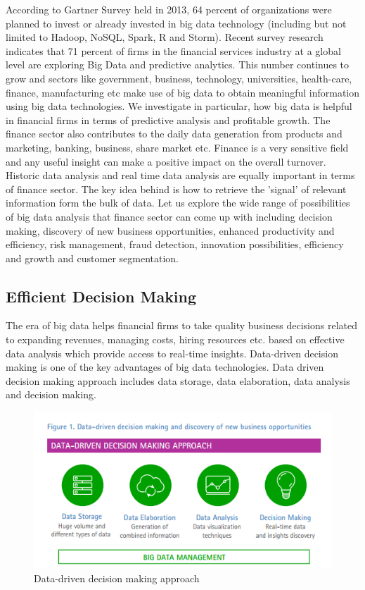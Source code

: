 \documentclass[sigconf]{acmart}
\begin{document}
According to Gartner Survey held in 2013, 64 percent of organizations were planned to invest or already invested in big data technology (including but not limited to Hadoop, NoSQL, Spark, R and Storm)\cite{gartner-survey}. Recent survey research indicates that 71 percent of firms in the financial services
industry at a global level are exploring Big
Data and predictive analytics\cite{accenture-next-generation-financial}. This number continues to grow and sectors like government, business, technology, universities, health-care, finance, manufacturing etc make use of big data to obtain meaningful information using big data technologies\cite{wiki-bigdata}. We investigate in particular, how big data is helpful in financial firms in terms of predictive analysis and profitable growth. The finance sector also contributes to the daily data generation from products and marketing, banking, business, share market etc. Finance is a very sensitive field and any useful insight can make a positive impact on the overall turnover. Historic data analysis and real time data analysis are equally important in terms of finance sector. The key idea behind is how to retrieve the 'signal' of relevant information form the bulk of data. Let us explore the wide range of possibilities of big data analysis that finance sector can come up with including decision making, discovery of new business opportunities, enhanced productivity and efficiency, risk management, fraud detection, innovation possibilities, efficiency and growth and customer segmentation.

\subsection{Efficient Decision Making}

The era of big data helps financial firms to take quality business decisions related to expanding revenues, managing costs, hiring resources etc. based on effective data analysis which provide access to real-time insights.  Data-driven decision making is one of the key advantages of big data technologies. Data driven decision making approach includes data storage, data elaboration, data analysis and decision making\cite{accenture-next-generation-financial}.

\begin{figure}[htb]
  \centering
  \includegraphics[width=1.0\columnwidth]{images/Figure1.png}
  \caption{Data-driven decision making approach 
  \cite{accenture-next-generation-financial}}
  \label{fig:Figure1} 
\end{figure}
\end{document}
